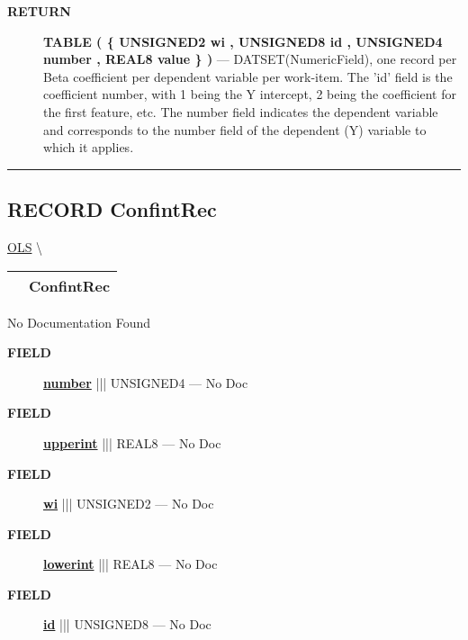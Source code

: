 \par
\begin{description}
\item [\colorbox{tagtype}{\color{white} \textbf{\textsf{RETURN}}}] \textbf{TABLE ( \{ UNSIGNED2 wi , UNSIGNED8 id , UNSIGNED4 number , REAL8 value \} )} --- DATSET(NumericField), one record per Beta coefficient per dependent variable per work-item. The 'id' field is the coefficient number, with 1 being the Y intercept, 2 being the coefficient for the first feature, etc. The number field indicates the dependent variable and corresponds to the number field of the dependent (Y) variable to which it applies.
\end{description}




\rule{\linewidth}{0.5pt}
\subsection*{\textsf{\colorbox{headtoc}{\color{white} RECORD}
ConfintRec}}

\hypertarget{ecldoc:linearregression.ols.confintrec}{}
\hspace{0pt} \hyperlink{ecldoc:linearregression.ols}{OLS} \textbackslash 

{\renewcommand{\arraystretch}{1.5}
\begin{tabularx}{\textwidth}{|>{\raggedright\arraybackslash}l|X|}
\hline
\hspace{0pt}\mytexttt{\color{red} } & \textbf{ConfintRec} \\
\hline
\end{tabularx}
}

\par





No Documentation Found







\par
\begin{description}
\item [\colorbox{tagtype}{\color{white} \textbf{\textsf{FIELD}}}] \textbf{\underline{number}} ||| UNSIGNED4 --- No Doc
\item [\colorbox{tagtype}{\color{white} \textbf{\textsf{FIELD}}}] \textbf{\underline{upperint}} ||| REAL8 --- No Doc
\item [\colorbox{tagtype}{\color{white} \textbf{\textsf{FIELD}}}] \textbf{\underline{wi}} ||| UNSIGNED2 --- No Doc
\item [\colorbox{tagtype}{\color{white} \textbf{\textsf{FIELD}}}] \textbf{\underline{lowerint}} ||| REAL8 --- No Doc
\item [\colorbox{tagtype}{\color{white} \textbf{\textsf{FIELD}}}] \textbf{\underline{id}} ||| UNSIGNED8 --- No Doc
\end{description}





